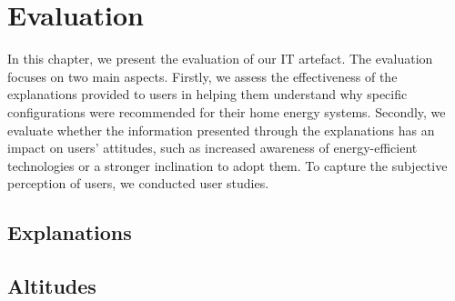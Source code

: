 \chapter{Evaluation}

In this chapter, we present the evaluation of our IT artefact. 
The evaluation focuses on two main aspects. 
Firstly, we assess the effectiveness of the explanations provided to users in helping them understand why specific configurations were recommended for their home energy systems.
Secondly, we evaluate whether the information presented through the explanations has an impact on users' attitudes, such as increased awareness of energy-efficient technologies or a stronger inclination to adopt them. 
To capture the subjective perception of users, we conducted user studies. 

\section{Explanations}


\section{Altitudes}
